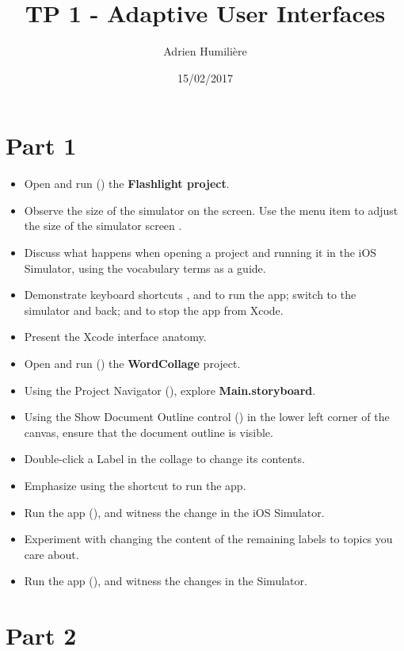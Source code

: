 \documentclass[a4paper,11pt]{scrartcl}
\begin{document}
\newcommand{\mytitle}{TP 1 - Adaptive User Interfaces}
\title{\mytitle}
\author{Adrien Humilière}
\date{15/02/2017}

\maketitle

\section*{Part 1}

\begin{itemize}
\item Open and run () the \textbf{Flashlight project}.
\item Observe the size of the simulator on the screen. Use the menu item  to adjust the size of the simulator screen       .
\item Discuss what happens when opening a project and running it in the iOS Simulator, using the vocabulary terms as a guide.
\item Demonstrate keyboard shortcuts , \keys{\cmd+\tab} and  to run the app; switch to the simulator and back; and to stop the app from Xcode.
\item Present the Xcode interface anatomy.
\item Open and run () the \textbf{WordCollage} project.
\item Using the Project Navigator (), explore \textbf{Main.storyboard}.
\item Using the Show Document Outline control () in the lower left corner of the canvas, ensure that the document outline is visible.
\item Double-click a Label in the collage to change its contents.
\item Emphasize using the  shortcut to run the app.
\item Run the app (), and witness the change in the iOS Simulator.
\item Experiment with changing the content of the remaining labels to topics you care about.
\item Run the app (), and witness the changes in the Simulator.
\end{itemize}

\section*{Part 2}
\end{document}
